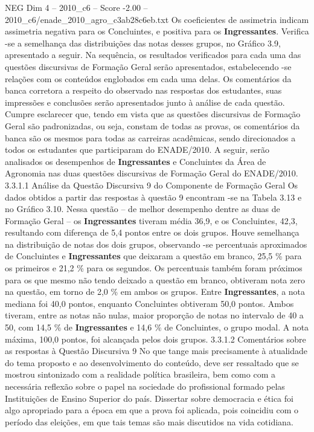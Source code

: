 \begin{textsample}{NEG Dim 4 – 2010\_c6 – Score -2.00 – 2010\_c6/enade\_2010\_agro\_c3ab28c6eb.txt}
Os coeficientes de assimetria indicam assimetria negativa para os Concluintes, e positiva para os \textbf{Ingressantes}.
Verifica -se a semelhança das distribuições das notas desses grupos, no Gráfico 3.9, apresentado a seguir.
Na sequência, os resultados verificados para cada uma das questões discursivas de Formação Geral serão apresentados, estabelecendo -se relações com os conteúdos englobados em cada uma delas.
Os comentários da banca corretora a respeito do observado nas respostas dos estudantes, suas impressões e conclusões serão apresentados junto à análise de cada questão.
Cumpre esclarecer que, tendo em vista que as questões discursivas de Formação Geral são padronizadas, ou seja, constam de todas as provas, os comentários da banca são os mesmos para todas as carreiras acadêmicas, sendo direcionados a todos os estudantes que participaram do ENADE/2010.
A seguir, serão analisados os desempenhos de \textbf{Ingressantes} e Concluintes da Área de Agronomia nas duas questões discursivas de Formação Geral do ENADE/2010. 3.3.1.1 Análise da Questão Discursiva 9 do Componente de Formação Geral Os dados obtidos a partir das respostas à questão 9 encontram -se na Tabela 3.13 e no Gráfico 3.10.
Nessa questão – de melhor desempenho dentre as duas de Formação Geral – os \textbf{Ingressantes} tiveram média 36,9, e os Concluintes, 42,3, resultando com diferença de 5,4 pontos entre os dois grupos.
Houve semelhança na distribuição de notas dos dois grupos, observando -se percentuais aproximados de Concluintes e \textbf{Ingressantes} que deixaram a questão em branco, 25,5 \% para os primeiros e 21,2 \% para os segundos.
Os percentuais também foram próximos para os que mesmo não tendo deixado a questão em branco, obtiveram nota zero na questão, em torno de 2,0 \% em ambos os grupos.
Entre \textbf{Ingressantes}, a nota mediana foi 40,0 pontos, enquanto Concluintes obtiveram 50,0 pontos.
Ambos tiveram, entre as notas não nulas, maior proporção de notas no intervalo de 40 a 50, com 14,5 \% de \textbf{Ingressantes} e 14,6 \% de Concluintes, o grupo modal.
A nota máxima, 100,0 pontos, foi alcançada pelos dois grupos. 3.3.1.2 Comentários sobre as respostas à Questão Discursiva 9 No que tange mais precisamente à atualidade do tema proposto e ao desenvolvimento do conteúdo, deve ser ressaltado que se mostrou sintonizado com a realidade política brasileira, bem como com a necessária reflexão sobre o papel na sociedade do profissional formado pelas Instituições de Ensino Superior do país.
Dissertar sobre democracia e ética foi algo apropriado para a época em que a prova foi aplicada, pois coincidiu com o período das eleições, em que tais temas são mais discutidos na vida cotidiana.

\end{textsample}
